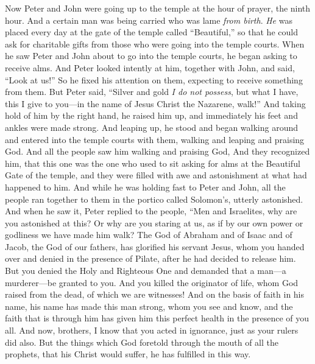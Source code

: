 \begin{biblechapter} %
 Now Peter and John were going up to the temple at the hour of prayer, the ninth hour.
\verse And a certain man was being carried who was lame \textit{from birth}. \textit{He} was placed every day at the gate of the temple called “Beautiful,” so that he could ask for charitable gifts from those who were going into the temple courts.
\verse When he saw Peter and John about to go into the temple courts, he began asking to receive alms.
\verse And Peter looked intently at him, together with John, and said, “Look at us!”
\verse So he fixed his attention on them, expecting to receive something from them.
\verse But Peter said, “Silver and gold \textit{I do not possess}, but what I have, this I give to you—in the name of Jesus Christ the Nazarene, walk!”
\verse And taking hold of him by the right hand, he raised him up, and immediately his feet and ankles were made strong.
\verse And leaping up, he stood and began walking around and entered into the temple courts with them, walking and leaping and praising God.
\verse And all the people saw him walking and praising God,
\verse And they recognized him, that this one was the one who used to sit asking for alms at the Beautiful Gate of the temple, and they were filled with awe and astonishment at what had happened to him.
 And while he was holding fast to Peter and John, all the people ran together to them in the portico called Solomon’s, utterly astonished.
\verse And when he saw it, Peter replied to the people, “Men and Israelites, why are you astonished at this? Or why are you staring at us, as if by our own power or godliness we have made him walk?
\verse The God of Abraham and of Isaac and of Jacob, the God of our fathers, has glorified his servant Jesus, whom you handed over and denied in the presence of Pilate, after he had decided to release him.
\verse But you denied the Holy and Righteous One and demanded that a man—a murderer—be granted to you.
\verse And you killed the originator of life, whom God raised from the dead, of which we are witnesses!
\verse And on the basis of faith in his name, his name has made this man strong, whom you see and know, and the faith that is through him has given him this perfect health in the presence of you all.
\verse And now, brothers, I know that you acted in ignorance, just as your rulers did also.
\verse But the things which God foretold through the mouth of all the prophets, that his Christ would suffer, he has fulfilled in this way.

\end{biblechapter}
